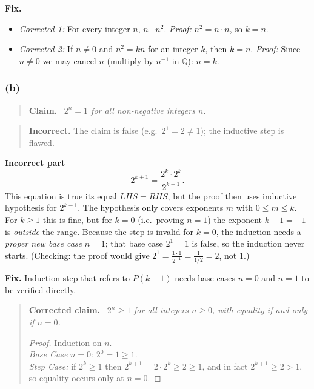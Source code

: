 \documentclass[11pt,a4paper]{article}
\newcommand{\Q}{\mathbb{Q}}
\newenvironment{claimbox}[1][]{\par\smallskip\begin{quote}\textbf{#1.}\ \itshape}{\end{quote}}
\newenvironment{verdictbox}[2][]{\par\begin{quote}}{\end{quote}}
\theoremstyle{definition}
\newcommand{\badmark}{\textbf{Incorrect.}}
\begin{document}
\textbf{Fix.}
\begin{itemize}
  \item \emph{Corrected 1:} For every integer $n$, $n\mid n^2$. \emph{Proof:} $n^2=n\cdot n$, so $k=n$.
  \item \emph{Corrected 2:} If $n\neq0$ and $n^2=kn$ for an integer $k$, then $k=n$.
        \emph{Proof:} Since $n\neq0$ we may cancel $n$ (multiply by $n^{-1}$ in $\Q$): $n=k$.
\end{itemize}







\subsubsection*{(b)}
\begin{claimbox}[Claim]
$2^n=1$ for all non-negative integers $n$.
\end{claimbox}

\begin{verdictbox}{badred}
\badmark{} The claim is false (e.g.\ $2^1=2\ne1$); the inductive step is flawed.
\end{verdictbox}

\textbf{Incorrect part}
\[
2^{k+1}=\frac{2^k\cdot 2^k}{2^{k-1}} .
\]
This equation is true its equal $LHS=RHS$, but the proof then uses inductive hypothesis for $2^{k-1}$.
The hypothesis only covers exponents $m$ with $0\le m\le k$.
For $k\ge1$ this is fine, but for $k=0$ (i.e.\ proving $n=1$) the exponent $k-1=-1$ is \emph{outside} the range.
Because the step is invalid for $k=0$, the induction needs a \emph{proper new base case} $n=1$; that base case $2^1=1$ is false, so the induction never starts.
(Checking: the proof would give $2^1=\frac{1\cdot1}{2^{-1}}=\frac{1}{1/2}=2$, not $1$.)

\textbf{Fix.} Induction step that refers to $P(k-1)$ needs base cases $n=0$ and $n=1$ to be verified directly.

\begin{claimbox}[Corrected claim]
$2^n\ge1$ for all integers $n\ge0$, with equality if and only if $n=0$.
\begin{proof}
Induction on $n$.\\ \emph{Base Case} $n=0$: $2^0=1\ge1$.\\ \emph{Step Case:} 
if $2^k\ge1$ then $2^{k+1}=2\cdot2^k\ge2\ge1$, and in fact $2^{k+1}\ge2>1$, 
so equality occurs only at $n=0$.
\end{proof}

\end{claimbox}
\end{document}
